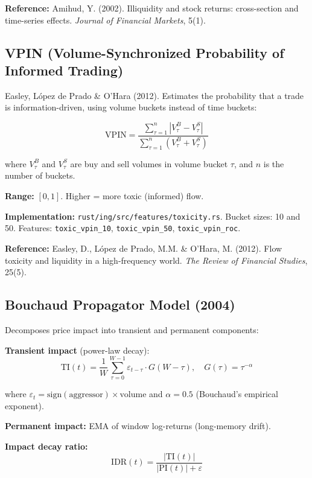 \documentclass[11pt,a4paper]{article}
\begin{document}
\textbf{Reference:} Amihud, Y. (2002). Illiquidity and stock returns: cross-section and time-series effects. \textit{Journal of Financial Markets}, 5(1).

\subsection{VPIN (Volume-Synchronized Probability of Informed Trading)}

Easley, L\'opez de Prado \& O'Hara (2012). Estimates the probability that a trade is information-driven, using volume buckets instead of time buckets:

\begin{equation}
\text{VPIN} = \frac{\sum_{\tau=1}^{n} |V_\tau^B - V_\tau^S|}{\sum_{\tau=1}^{n} (V_\tau^B + V_\tau^S)}
\end{equation}

where $V_\tau^B$ and $V_\tau^S$ are buy and sell volumes in volume bucket $\tau$, and $n$ is the number of buckets.

\textbf{Range:} $[0, 1]$. Higher = more toxic (informed) flow.

\textbf{Implementation:} \texttt{rust/ing/src/features/toxicity.rs}. Bucket sizes: 10 and 50. Features: \texttt{toxic\_vpin\_10}, \texttt{toxic\_vpin\_50}, \texttt{toxic\_vpin\_roc}.

\textbf{Reference:} Easley, D., L\'opez de Prado, M.M. \& O'Hara, M. (2012). Flow toxicity and liquidity in a high-frequency world. \textit{The Review of Financial Studies}, 25(5).

\subsection{Bouchaud Propagator Model (2004)}

Decomposes price impact into transient and permanent components:

\textbf{Transient impact} (power-law decay):
\begin{equation}
\text{TI}(t) = \frac{1}{W} \sum_{\tau=0}^{W-1} \varepsilon_{t-\tau} \cdot G(W - \tau), \quad G(\tau) = \tau^{-\alpha}
\end{equation}

where $\varepsilon_t = \text{sign}(\text{aggressor}) \times \text{volume}$ and $\alpha = 0.5$ (Bouchaud's empirical exponent).

\textbf{Permanent impact:} EMA of window log-returns (long-memory drift).

\textbf{Impact decay ratio:}
\begin{equation}
\text{IDR}(t) = \frac{|\text{TI}(t)|}{|\text{PI}(t)| + \varepsilon}
\end{equation}
\end{document}
